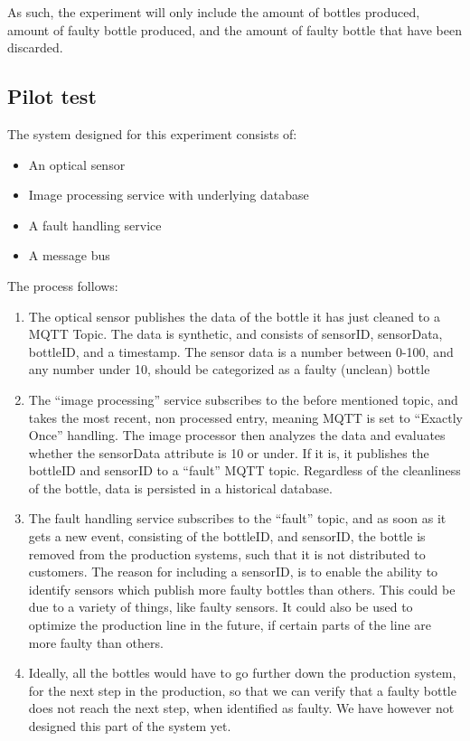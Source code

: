 As such, the experiment will only include the amount of bottles produced, amount of faulty bottle produced, and the amount of faulty bottle that have been discarded.

\subsection{Pilot test}
\label{sec:pilot_test}

The system designed for this experiment consists of:
\begin{itemize}
    \item An optical sensor
    \item Image processing service with underlying database
    \item A fault handling service
    \item A message bus
\end{itemize}
The process follows:
\begin{enumerate}
    \item The optical sensor publishes the data of the bottle it has just cleaned to a MQTT Topic. The data is synthetic, and consists of sensorID, sensorData, bottleID, and a timestamp. The sensor data is a number between 0-100, and any number under 10, should be categorized as a faulty (unclean) bottle
    \item The “image processing” service subscribes to the before mentioned topic, and takes the most recent, non processed  entry, meaning MQTT is set to “Exactly Once” handling. The image processor then analyzes the data and evaluates whether the sensorData attribute is 10 or under. If it is, it publishes the bottleID and sensorID to a “fault” MQTT topic. Regardless of the cleanliness of the bottle, data is persisted in a historical database.
    \item The fault handling service subscribes to the “fault” topic, and as soon as it gets a new event, consisting of the bottleID, and sensorID, the bottle is removed from the production systems, such that it is not distributed to customers. The reason for including a sensorID, is to enable the ability to identify sensors which publish more faulty bottles than others. This could be due to a variety of things, like faulty sensors. It could also be used to optimize the production line in the future, if certain parts of the line are more faulty than others.
    \item Ideally, all the bottles would have to go further down the production system, for the next step in the production, so that we can verify that a faulty bottle does not reach the next step, when identified as faulty. We have however not designed this part of the system yet.
\end{enumerate}

